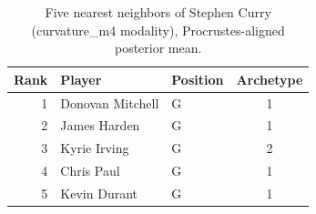 \begin{table}[htbp]
  \centering\small
  \begin{tabular}{rllc}
    \toprule
    Rank & Player & Position & Archetype \\
    \midrule
    1 & Donovan Mitchell & G & 1 \\
    2 & James Harden & G & 1 \\
    3 & Kyrie Irving & G & 2 \\
    4 & Chris Paul & G & 1 \\
    5 & Kevin Durant & G & 1 \\
    \bottomrule
  \end{tabular}
  \caption{Five nearest neighbors of Stephen Curry (curvature_m4 modality), Procrustes-aligned posterior mean.}
  \label{tab:Stephen_Curry_neighbors_curvature_m4}
\end{table}


